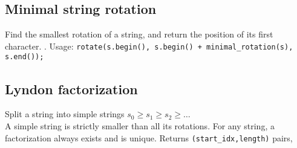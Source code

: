 \subsection{Minimal string rotation}
Find the smallest rotation of a string, and return the position of its first character. . Usage:
\texttt{rotate(s.begin(), s.begin() + minimal\_rotation(s), s.end());}

\subsection{Lyndon factorization}
Split a string into simple strings $s_0 \geq s_1 \geq s_2 \geq \ldots $\\
A simple string is strictly smaller than all its rotations. For any string, a factorization always exists and is unique. Returns \texttt{(start\_idx,length)} pairs, 

